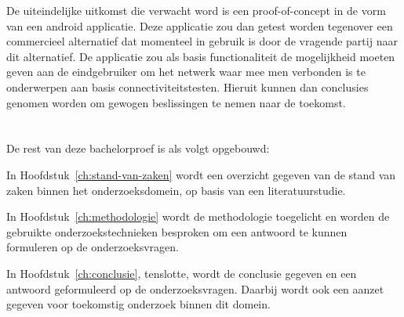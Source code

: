 De uiteindelijke uitkomst die verwacht word is een proof-of-concept in de vorm van een android applicatie. Deze applicatie zou dan getest worden tegenover een commercieel alternatief dat momenteel in gebruik is door de vragende partij naar dit alternatief. De applicatie zou als basis functionaliteit de mogelijkheid moeten geven aan de eindgebruiker om het netwerk waar mee men verbonden is te onderwerpen aan basis connectiviteitstesten. Hieruit kunnen dan conclusies genomen worden om gewogen beslissingen te nemen naar de toekomst.

\section{}%
\label{sec:opzet-bachelorproef}


De rest van deze bachelorproef is als volgt opgebouwd:

In Hoofdstuk~\ref{ch:stand-van-zaken} wordt een overzicht gegeven van de stand van zaken binnen het onderzoeksdomein, op basis van een literatuurstudie.

In Hoofdstuk~\ref{ch:methodologie} wordt de methodologie toegelicht en worden de gebruikte onderzoekstechnieken besproken om een antwoord te kunnen formuleren op de onderzoeksvragen.


In Hoofdstuk~\ref{ch:conclusie}, tenslotte, wordt de conclusie gegeven en een antwoord geformuleerd op de onderzoeksvragen. Daarbij wordt ook een aanzet gegeven voor toekomstig onderzoek binnen dit domein.